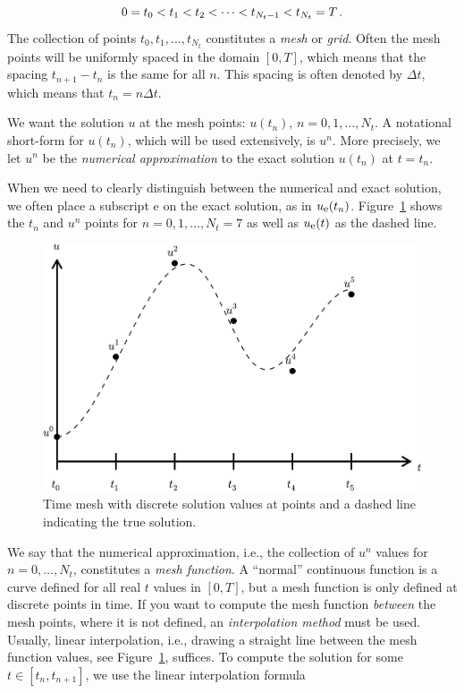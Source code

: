\documentclass[%
oneside,                 %
final,                   %
10pt]{article}
\begin{document}
\begin{equation}
0 = t_0 < t_1 < t_2 < \cdots < t_{N_t-1} < t_{N_t} = T\tp
\end{equation}
The collection of points $t_0,t_1,\ldots,t_{N_t}$ constitutes a \emph{mesh}
or \emph{grid}. Often the mesh points will be uniformly spaced in
the domain $[0,T]$, which means that the spacing $t_{n+1}-t_n$ is
the same for all $n$. This spacing is often denoted by $\Delta t$,
which means that $t_n=n\Delta t$.


We want the solution $u$ at the mesh points:
$u(t_n)$, $n=0,1,\ldots,N_t$.
A notational short-form for $u(t_n)$,
which will be used extensively, is $u^{n}$. More precisely, we let
$u^n$ be the \emph{numerical approximation} to the exact solution $u(t_n)$
at $t=t_n$.

When we need to clearly distinguish between the numerical and exact solution,
we often place a subscript e on the exact solution, as in $\uex(t_n)$.
Figure~\ref{decay:fdu:e} shows the $t_n$ and $u^n$ points for $n=0,1,\ldots,N_t=7$ as well as $\uex(t)$ as the dashed line.


\begin{figure}[!ht]  %
  \centerline{\includegraphics[width=1.0\linewidth]{fig-alg/fdm_u_ue.pdf}}
  \caption{
  Time mesh with discrete solution values at points and a dashed line indicating the true solution. \label{decay:fdu:e}
  }
\end{figure}



We say that the numerical approximation, i.e.,
the collection of $u^n$ values for $n=0,\ldots,N_t$,
constitutes a \emph{mesh function}.
A ``normal'' continuous function is a curve defined for all real $t$
values in $[0,T]$, but a mesh function is only defined at discrete
points in time. If you want to compute the mesh function \emph{between} the
mesh points, where it is not defined, an \emph{interpolation method} must be
used. Usually, linear interpolation, i.e., drawing a straight line between
the mesh function values, see Figure~\ref{decay:fdu:e}, suffices.
To compute the solution for some $t\in [t_n, t_{n+1}]$, we use the
linear interpolation formula
\end{document}
